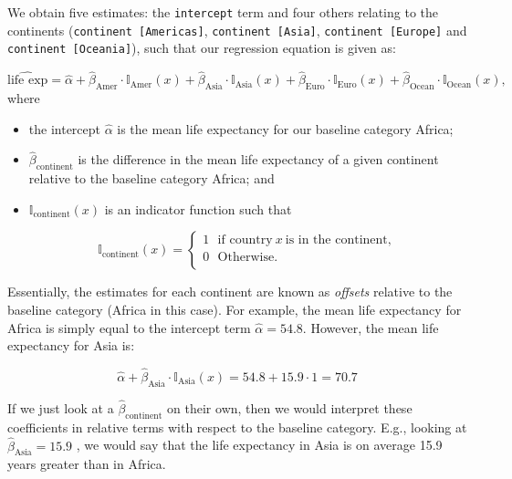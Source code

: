 \documentclass[
  letterpaper,
  DIV=11,
  numbers=noendperiod]{scrartcl}
\begin{document}
We obtain five estimates: the \texttt{intercept} term and four others
relating to the continents (\texttt{continent\ {[}Americas{]}},
\texttt{continent\ {[}Asia{]}}, \texttt{continent\ {[}Europe{]}} and
\texttt{continent\ {[}Oceania{]}}), such that our regression equation is
given as:

\[\widehat{\text{life exp}} = \widehat{\alpha} + \widehat{\beta}_{\text{Amer}} \cdot \mathbb{I}_{\text{Amer}}(x) + \widehat{\beta}_{\text{Asia}} \cdot \mathbb{I}_{\text{Asia}}(x) + \widehat{\beta}_{\text{Euro}} \cdot \mathbb{I}_{\text{Euro}}(x) + \widehat{\beta}_{\text{Ocean}} \cdot \mathbb{I}_{\text{Ocean}}(x),\]
where

\begin{itemize}
\item
  the intercept \(\widehat{\alpha}\) is the mean life expectancy for our
  baseline category Africa;
\item
  \(\widehat{\beta}_{\text{continent}}\) is the difference in the mean
  life expectancy of a given continent relative to the baseline category
  Africa; and
\item
  \(\mathbb{I}_{\text{continent}}(x)\) is an indicator function such
  that

  \[\mathbb{I}_{\text{continent}}(x)=\left\{
              \begin{array}{ll}
                1 ~~~ \text{if country} ~ x ~ \text{is in the continent},\\
                0 ~~~ \text{Otherwise}.\\
              \end{array}
            \right.\]
\end{itemize}

Essentially, the estimates for each continent are known as
\emph{offsets} relative to the baseline category (Africa in this case).
For example, the mean life expectancy for Africa is simply equal to the
intercept term \(\widehat{\alpha} = 54.8\). However, the mean life
expectancy for Asia is:

\[\widehat{\alpha} + \widehat{\beta}_{\text{Asia}} \cdot \mathbb{I}_{\text{Asia}}(x) = 54.8 + 15.9 \cdot 1 = 70.7 \]

If we just look at a \(\widehat{\beta}_{\text{continent}}\) on their
own, then we would interpret these coefficients in relative terms with
respect to the baseline category. E.g., looking at
\(\widehat{\beta}_{\text{Asia}}=15.9\) , we would say that the life
expectancy in Asia is on average 15.9 years greater than in Africa.
\end{document}
